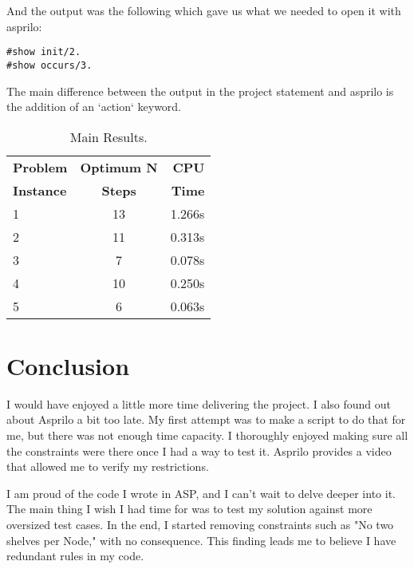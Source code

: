 \documentclass[letterpaper]{article} %
\begin{document}
And the output was the following which gave us what we needed to open it with asprilo:

\begin{lstlisting}[numbers=none,language=clingo]
#show init/2.
#show occurs/3.
\end{lstlisting}

The main difference between the output in the project statement\cite{cse579:CourseProject} and asprilo\cite{cse579:asprilo} is the addition of an `action` keyword.

\begin{table}[h!]
  \begin{center}
    \caption{Main Results.}
    \label{tab:table1}
    \begin{tabular}{l|c|r} %
      \textbf{Problem} & \textbf{Optimum N} & \textbf{CPU}\\
      \textbf{Instance} & \textbf{Steps} & \textbf{Time}\\
      \hline
      1 & 13 & 1.266s\\
      2 & 11 & 0.313s\\
      3 & 7 & 0.078s\\
      4 & 10 & 0.250s\\
      5 & 6 & 0.063s\\
    \end{tabular}
  \end{center}
\end{table}

\section{Conclusion}

I would have enjoyed a little more time delivering the project. I also found out about Asprilo a bit too late. My first attempt was to make a script to do that for me, but there was not enough time capacity. I thoroughly enjoyed making sure all the constraints were there once I had a way to test it. Asprilo provides a video that allowed me to verify my restrictions. 

I am proud of the code I wrote in ASP, and I can't wait to delve deeper into it. The main thing I wish I had time for was to test my solution against more oversized test cases. In the end, I started removing constraints such as "No two shelves per Node," with no consequence. This finding leads me to believe I have redundant rules in my code.
\end{document}
